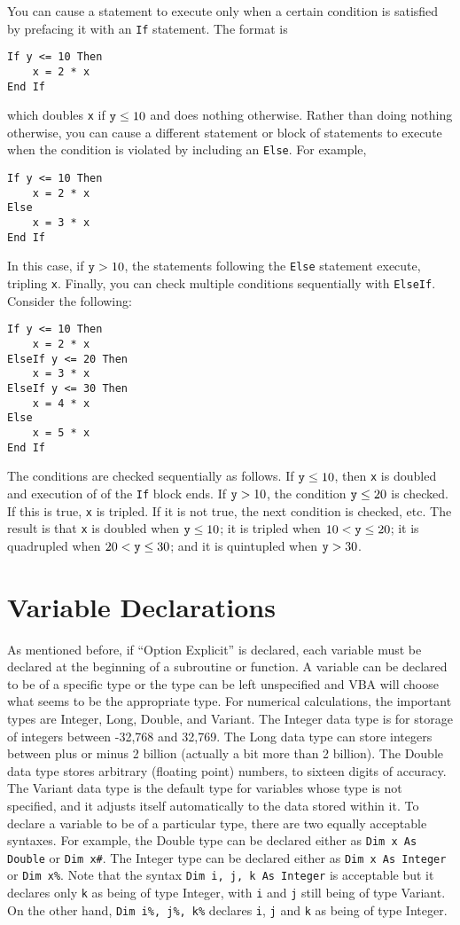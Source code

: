 {You can cause a statement to execute only when a certain condition is satisfied by prefacing it with an \verb!If! statement.  The format is
\small\begin{verbatim}
If y <= 10 Then
    x = 2 * x
End If
\end{verbatim}\normalsize
\noindent which doubles \verb!x! if $\verb!y!\leq 10$ and does nothing otherwise.  Rather than doing nothing otherwise, you can cause a different statement or block of statements to execute when the condition is violated by including an \verb!Else!.  For example,
\small\begin{verbatim}
If y <= 10 Then
    x = 2 * x
Else
    x = 3 * x
End If
\end{verbatim}\normalsize
In this case, if $\verb!y! > 10$, the statements following the \verb!Else! statement execute, tripling \verb!x!.  Finally, you can check multiple conditions sequentially with \verb!ElseIf!.  Consider the following:
\small\begin{verbatim}
If y <= 10 Then
    x = 2 * x
ElseIf y <= 20 Then
    x = 3 * x
ElseIf y <= 30 Then
    x = 4 * x
Else
    x = 5 * x
End If
\end{verbatim}\normalsize
\noindent The conditions are checked sequentially as follows.  If $\verb!y!\leq 10$, then \verb!x! is doubled and execution of of the \verb!If! block ends.  If $\verb!y! > 10$, the condition $\verb!y! \leq 20$ is checked.  If this is true, \verb!x! is tripled.  If it is not true, the next condition is checked, etc.  The result is that \verb!x! is doubled when $\verb!y!\leq 10$; it is tripled when $10<\verb!y!\leq 20$; it is quadrupled when  $20<\verb!y!\leq 30$; and it is quintupled when $\verb!y!>30$.

\section{Variable Declarations}
As mentioned before, if ``Option Explicit'' is declared, each variable must be declared at the beginning of a subroutine or function.  A variable can be declared to be of a specific type or the type can be left unspecified and VBA will choose what seems to be the appropriate type.  For numerical calculations, the important types are Integer, Long, Double, and Variant.  The Integer data type is for storage of integers between -32,768 and 32,769.  The Long data type can store integers between plus or minus 2 billion (actually a bit more than 2 billion).  The Double data type stores arbitrary (floating point) numbers, to sixteen digits of accuracy.  The Variant data type is the default  type for variables whose type is not specified, and it adjusts itself automatically to the data stored within it.  To declare a variable to be of a particular type, there are two equally acceptable syntaxes.  For example, the Double type can be declared either as \verb!Dim x As Double! or \verb!Dim x#!.  The Integer type can be declared either as \verb!Dim x As Integer! or \verb!Dim x%!.  Note that the syntax \verb!Dim i, j, k As Integer! is acceptable but it declares only \verb!k! as being of type Integer, with \verb!i! and \verb!j! still being of type Variant.  On the other hand, \verb!Dim i%, j%, k%! declares \verb!i!, \verb!j! and \verb!k! as being of type Integer.  

}
